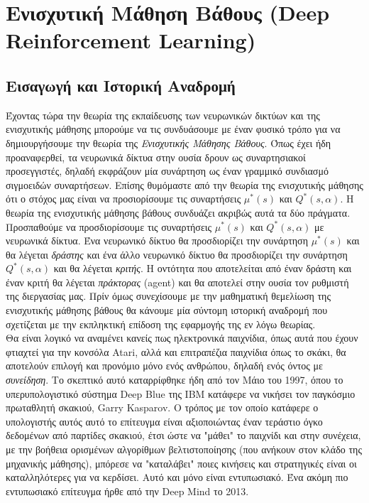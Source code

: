 \documentclass[11pt]{article} %
\numberwithin{equation}{subsection}
\begin{document}
\section{Ενισχυτική Μάθηση Βάθους (Deep Reinforcement Learning)}

\subsection{Εισαγωγή και Ιστορική Αναδρομή}

Έχοντας τώρα την θεωρία της εκπαίδευσης των νευρωνικών δικτύων και της ενισχυτικής μάθησης μπορούμε να τις συνδυάσουμε με έναν φυσικό τρόπο για να δημιουργήσουμε την θεωρία της \textit{Ενισχυτικής Μάθησης Βάθους}. Όπως έχει ήδη προαναφερθεί, τα νευρωνικά δίκτυα στην ουσία δρουν ως συναρτησιακοί προσεγγιστές, δηλαδή εκφράζουν μία συνάρτηση ως έναν γραμμικό συνδιασμό σιγμοειδών συναρτήσεων. Επίσης θυμόμαστε από την θεωρία της ενισχυτικής μάθησης ότι ο στόχος μας είναι να προσιορίσουμε τις συναρτήσεις $\mu^{*}(s)$ και $Q^{*}(s, \alpha)$. Η θεωρία της ενισχυτικής μάθησης βάθους συνδυάζει ακριβώς αυτά τα δύο πράγματα. Προσπαθούμε να προσδιορίσουμε τις συναρτήσεις $\mu^{*}(s)$ και $Q^{*}(s, \alpha)$ με νευρωνικά δίκτυα. Ένα νευρωνικό δίκτυο θα προσδιορίζει την συνάρτηση $\mu^{*}(s)$ και θα λέγεται \textit{δράστης} και ένα άλλο νευρωνικό δίκτυο θα προσδιορίζει την συνάρτηση  $Q^{*}(s, \alpha)$ και θα λέγεται \textit{κριτής}. Η οντότητα που αποτελείται από έναν δράστη και έναν κριτή θα λέγεται \textit{πράκτορας} (agent) και θα αποτελεί στην ουσία τον ρυθμιστή της διεργασίας μας. Πρίν όμως συνεχίσουμε με την μαθηματική θεμελίωση της ενισχυτικής μάθησης βάθους θα κάνουμε μία σύντομη ιστορική αναδρομή που σχετίζεται με την εκπληκτική επίδοση της εφαρμογής της εν λόγω θεωρίας.  \\

Θα είναι λογικό να αναμένει κανείς πως ηλεκτρονικά παιχνίδια, όπως αυτά που έχουν φτιαχτεί για την κονσόλα Atari, αλλά και επιτραπέζια παιχνίδια όπως το σκάκι, θα αποτελούν επιλογή και προνόμιο μόνο ενός ανθρώπου, δηλαδή ενός όντος με \textit{συνείδηση}. Το σκεπτικό αυτό καταρρίφθηκε ήδη από τον Μάιο του 1997, όπου το υπερυπολογιστικό σύστημα Deep Blue της IBM κατάφερε να νικήσει τον παγκόσμιο πρωταθλητή σκακιού, Garry Kasparov. Ο τρόπος με τον οποίο κατάφερε ο υπολογιστής αυτός αυτό το επίτευγμα είναι αξιοποιώντας έναν τεράστιο όγκο δεδομένων από παρτίδες σκακιού, έτσι ώστε να "μάθει" το παιχνίδι και στην συνέχεια, με την βοήθεια ορισμένων αλγορίθμων βελτιστοποίησης (που ανήκουν στον κλάδο της μηχανικής μάθησης), μπόρεσε να "καταλάβει" ποιες κινήσεις και στρατηγικές είναι οι καταλληλότερες για να κερδίσει. Αυτό και μόνο είναι εντυπωσιακό. Ένα ακόμη πιο εντυπωσιακό επίτευγμα ήρθε από την Deep Mind το 2013.\\
\end{document}
